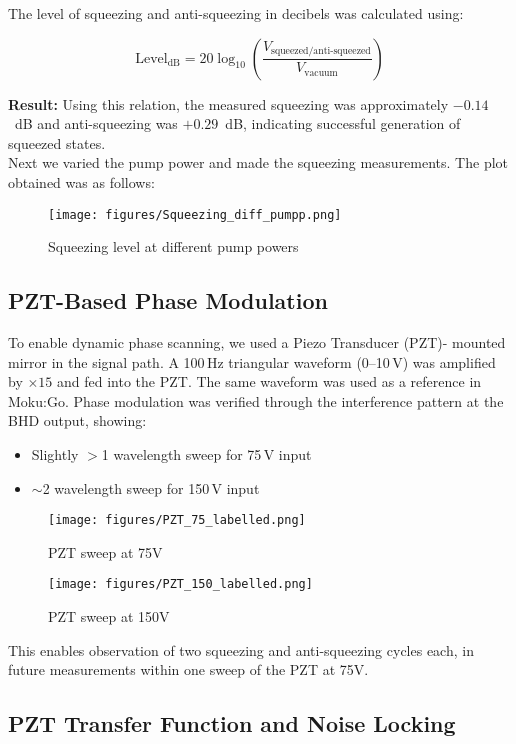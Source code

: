 \documentclass[colorlinks=true,pdfstartview=FitV,linkcolor=blue,
citecolor=red,urlcolor=magenta]{ligodoc}
\begin{document}
The level of squeezing and anti-squeezing in decibels was calculated using:

\[
\text{Level}_{\text{dB}} = 20 \log_{10} \left( \frac{V_{\text{squeezed/anti-squeezed}}}{V_{\text{vacuum}}} \right)
\]

\textbf{Result:} Using this relation, the measured squeezing was approximately $-0.14$~dB and anti-squeezing was $+0.29$~dB, indicating successful generation of squeezed states.\\


Next we varied the pump power and made the squeezing measurements. The plot obtained was as follows:
\begin{figure}[H]
    \centering
    \texttt{[image: figures/Squeezing\_diff\_pumpp.png]}
   \caption{ Squeezing level at  different pump powers}
    \label{fig:enter-label}
\end{figure}


\subsection{PZT-Based Phase Modulation}

To enable dynamic phase scanning, we used a Piezo Transducer (PZT)- mounted mirror in the signal path. A 100\,Hz triangular waveform (0--10\,V) was amplified by $\times15$ and fed into the PZT. The same waveform was used as a reference in Moku:Go. Phase modulation was verified through the interference pattern at the BHD output, showing:
\begin{itemize}
    \item Slightly $>$1 wavelength sweep for 75\,V input
    \item $\sim$2 wavelength sweep for 150\,V input
\end{itemize}
\begin{figure}[H]
    \centering
    \texttt{[image: figures/PZT\_75\_labelled.png]}
   \caption{  PZT sweep at 75V}
    \label{fig:enter-label}
\end{figure}
\begin{figure}[H]
    \centering
    \texttt{[image: figures/PZT\_150\_labelled.png]}
   \caption{  PZT sweep at 150V}
    \label{fig:enter-label}
\end{figure}
This enables observation of two squeezing and anti-squeezing cycles each, in future measurements within one sweep of the PZT at 75V.

\subsection{PZT Transfer Function and Noise Locking}
\end{document}
